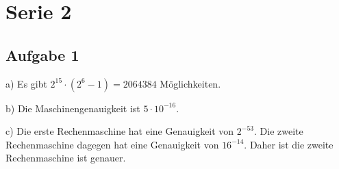 \documentclass[a4paper,9pt]{article}
\begin{document}
    \raggedcolumns

    

    \newpage

    \section*{Serie 2}

    \subsection*{Aufgabe 1}

    a) Es gibt $2^{15} \cdot (2^6 - 1) = 2064384$ Möglichkeiten.

    b) Die Maschinengenauigkeit ist $5 \cdot 10^{-16}$.

    c) Die erste Rechenmaschine hat eine Genauigkeit von $2^{-53}$.
    Die zweite Rechenmaschine dagegen hat eine Genauigkeit von $16^{-14}$.
    Daher ist die zweite Rechenmaschine ist genauer.

    \newpage

    

    

    

    

    
\end{document}
